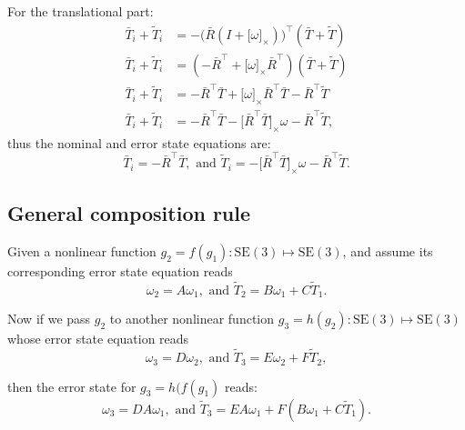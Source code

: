 \documentclass[letter,10pt]{article}
\newcommand{\SE}[1]{ \mathrm{SE(#1)} }
\newcommand{\asym}[1]{{\lbrack #1\rbrack}_\times{}}
\begin{document}
For the translational part:
\begin{align}
    \bar T_i + \tilde T_i &= -\big(\bar R(I + \asym{\omega})\big)^\top(\bar T + \tilde T) \\
    \bar T_i + \tilde T_i &= (-\bar R^\top + \asym{\omega}\bar R^\top)(\bar T + \tilde T) \\
    \bar T_i + \tilde T_i &= -\bar R^\top \bar T + \asym{\omega}\bar R^\top\bar T -\bar R^\top \tilde T \\
    \bar T_i + \tilde T_i &= -\bar R^\top \bar T - \asym{\bar R^\top\bar T}\omega -\bar R^\top \tilde T,
\end{align}
thus the nominal and error state equations are:
$$
\bar T_i = -\bar R^\top\bar T,\text{ and } \tilde T_i = -\asym{\bar R^\top\bar T}\omega - \bar R^\top \tilde T.
$$

\subsection{General composition rule}
Given a nonlinear function $g_2=f(g_1): \SE{3}\mapsto\SE{3}$, and assume its corresponding error state equation reads
$$
\omega_2 = A \omega_1, \text{ and } \tilde T_2 = B \omega_1 + C \tilde T_1.
$$

Now if we pass $g_2$ to another nonlinear function $g_3=h(g_2):\SE{3}\mapsto\SE{3}$ whose error state equation reads
$$
\omega_3 = D \omega_2, \text{ and } \tilde T_3 = E \omega_2 + F \tilde T_2,
$$

then the error state for $g_3=h(f(g_1)$ reads:
$$
\omega_3 = D A \omega_1, \text{ and } \tilde T_3 = E A \omega_1 + F(B\omega_1 + C\tilde T_1).
$$




\clearpage


\end{document}
